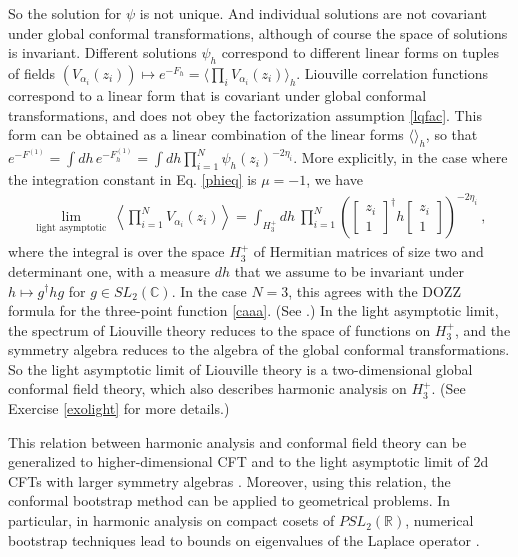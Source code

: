 \documentclass[12pt, a4paper, notitlepage, twoside]{report}
\numberwithin{equation}{section}
\theoremstyle{break}
\begin{document}
So the solution for $\psi$ is not unique. And individual solutions are not covariant under global conformal transformations, although of course the space of solutions is invariant.
Different solutions $\psi_h$ correspond to different linear forms on tuples of fields $(V_{\alpha_i}(z_i)) \mapsto e^{-F_h} = \langle \prod_i V_{\alpha_i}(z_i)\rangle_h$. 
Liouville correlation functions correspond to a linear form that is covariant under global conformal transformations, and does not obey the factorization assumption \eqref{lqfac}. 
This form can be obtained as a linear combination of the linear forms $\langle \rangle_h$, so that $e^{-F^{(1)}} = \int dh\, e^{-F^{(1)}_h} = \int dh \prod_{i=1}^N \psi_h(z_i)^{-2\eta_i}$. 
More explicitly, in the case where the integration constant in Eq. \eqref{phieq} is $\mu=-1$, we have
\begin{align}
\underset{\text{light asymptotic}}{\lim}\ \left\langle\prod_{i=1}^N V_{\alpha_i}(z_i)\right\rangle= \int_{H^+_3} dh\ \prod_{i=1}^N \left( \left[\begin{smallmatrix} z_i \\ 1 \end{smallmatrix}\right]^\dagger h \left[\begin{smallmatrix} z_i \\ 1 \end{smallmatrix}\right] \right)^{-2\eta_i}\ ,
\label{zih}
\end{align}
where the integral is over the space \textbf{\boldmath $H_3^+$} of Hermitian matrices of size two and determinant one, with a measure $dh$ that we assume to be invariant under $h\mapsto g^\dagger hg$ for $g\in SL_2({\mathbb{C}})$.
In the case $N=3$, this agrees with the DOZZ formula for the three-point function \eqref{caaa}. (See \cite{zz95}.) In the light asymptotic limit, the spectrum of Liouville theory reduces to the space of functions on $H_3^+$, and the symmetry algebra reduces to the algebra of the global conformal transformations.
So the light asymptotic limit of Liouville theory is a two-dimensional global conformal field theory, which also describes harmonic analysis on $H_3^+$. (See Exercise \ref{exolight} for more details.)

This relation between harmonic analysis and conformal field theory can be generalized to higher-dimensional CFT \cite{kks18} and to the light asymptotic limit of 2d CFTs with larger symmetry algebras \cite{fr11}. Moreover, using this relation, the conformal bootstrap method can be applied to geometrical problems. In particular, in harmonic analysis on compact cosets of $PSL_2(\mathbb{R})$, numerical bootstrap techniques lead to bounds on eigenvalues of the Laplace operator \cite{kmp21}.
\end{document}
